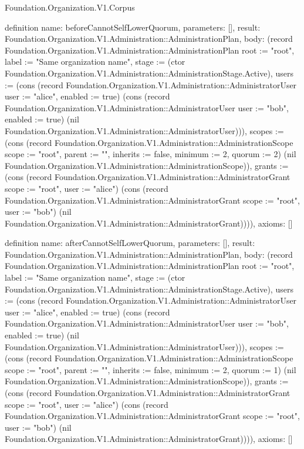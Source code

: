 \begin{lexlean}{Foundation.Organization.V1.Corpus}
\begin{semanticmodule}
definition{
  name: beforeCannotSelfLowerQuorum,
  parameters: [],
  result: Foundation.Organization.V1.Administration::AdministrationPlan,
  body: (record Foundation.Organization.V1.Administration::AdministrationPlan {root := "root", label := "Same organization name", stage := (ctor Foundation.Organization.V1.Administration::AdministrationStage.Active), users := (cons (record Foundation.Organization.V1.Administration::AdministratorUser {user := "alice", enabled := true}) (cons (record Foundation.Organization.V1.Administration::AdministratorUser {user := "bob", enabled := true}) (nil Foundation.Organization.V1.Administration::AdministratorUser))), scopes := (cons (record Foundation.Organization.V1.Administration::AdministrationScope {scope := "root", parent := "", inherits := false, minimum := 2, quorum := 2}) (nil Foundation.Organization.V1.Administration::AdministrationScope)), grants := (cons (record Foundation.Organization.V1.Administration::AdministratorGrant {scope := "root", user := "alice"}) (cons (record Foundation.Organization.V1.Administration::AdministratorGrant {scope := "root", user := "bob"}) (nil Foundation.Organization.V1.Administration::AdministratorGrant)))}),
  axioms: []
}

definition{
  name: afterCannotSelfLowerQuorum,
  parameters: [],
  result: Foundation.Organization.V1.Administration::AdministrationPlan,
  body: (record Foundation.Organization.V1.Administration::AdministrationPlan {root := "root", label := "Same organization name", stage := (ctor Foundation.Organization.V1.Administration::AdministrationStage.Active), users := (cons (record Foundation.Organization.V1.Administration::AdministratorUser {user := "alice", enabled := true}) (cons (record Foundation.Organization.V1.Administration::AdministratorUser {user := "bob", enabled := true}) (nil Foundation.Organization.V1.Administration::AdministratorUser))), scopes := (cons (record Foundation.Organization.V1.Administration::AdministrationScope {scope := "root", parent := "", inherits := false, minimum := 2, quorum := 1}) (nil Foundation.Organization.V1.Administration::AdministrationScope)), grants := (cons (record Foundation.Organization.V1.Administration::AdministratorGrant {scope := "root", user := "alice"}) (cons (record Foundation.Organization.V1.Administration::AdministratorGrant {scope := "root", user := "bob"}) (nil Foundation.Organization.V1.Administration::AdministratorGrant)))}),
  axioms: []
}


\end{semanticmodule}
\end{lexlean}

